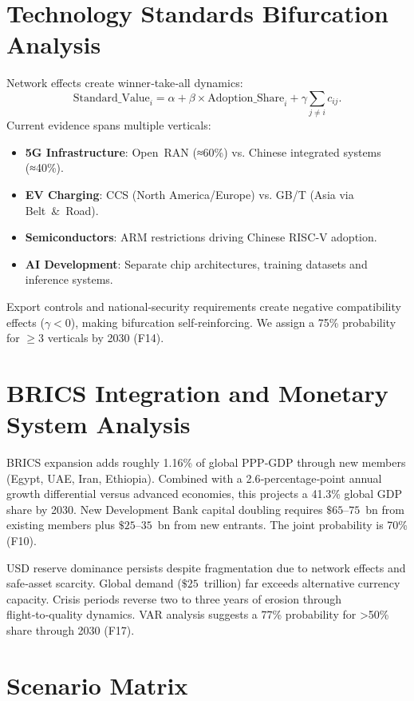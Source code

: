 \documentclass{article}
\begin{document}
\section{Technology Standards Bifurcation Analysis}

Network effects create winner‑take‑all dynamics:
\[
\text{Standard\_Value}_i = \alpha + \beta \times \text{Adoption\_Share}_i + \gamma \sum_{j \neq i} c_{ij}.
\]
Current evidence spans multiple verticals:
\begin{itemize}
\item \textbf{5G Infrastructure}: Open RAN (≈60\%) vs. Chinese integrated systems (≈40\%).
\item \textbf{EV Charging}: CCS (North America/Europe) vs. GB/T (Asia via Belt \& Road).
\item \textbf{Semiconductors}: ARM restrictions driving Chinese RISC‑V adoption.
\item \textbf{AI Development}: Separate chip architectures, training datasets and inference systems.
\end{itemize}

Export controls and national‑security requirements create negative compatibility effects ($\gamma < 0$), making bifurcation self‑reinforcing.  We assign a 75\% probability for $\geq 3$ verticals by 2030 (F14).

\section{BRICS Integration and Monetary System Analysis}

BRICS expansion adds roughly 1.16\% of global PPP‑GDP through new members (Egypt, UAE, Iran, Ethiopia).  Combined with a 2.6‑percentage‑point annual growth differential versus advanced economies, this projects a 41.3\% global GDP share by 2030.  New Development Bank capital doubling requires $\$65$–$75$ bn from existing members plus $\$25$–$35$ bn from new entrants.  The joint probability is 70\% (F10).

USD reserve dominance persists despite fragmentation due to network effects and safe‑asset scarcity.  Global demand ($\$25$ trillion) far exceeds alternative currency capacity.  Crisis periods reverse two to three years of erosion through flight‑to‑quality dynamics.  VAR analysis suggests a 77\% probability for >50\% share through 2030 (F17).

\section{Scenario Matrix}
\end{document}
